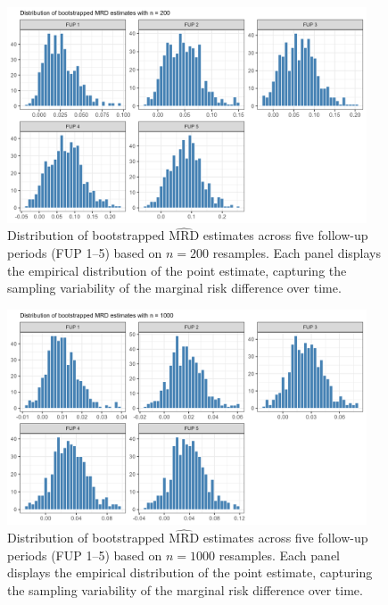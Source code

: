\documentclass[pdflatex,sn-vancouver-ay]{sn-jnl}%
\theoremstyle{thmstyleone}%
\theoremstyle{thmstyletwo}%
\theoremstyle{thmstylethree}%
\begin{document}
\begin{appendices}
\begin{figure}[h]
\centering
\includegraphics[width=0.95\textwidth]{plots_dist/plot_BSdist_200.png}
\caption{Distribution of bootstrapped $\widehat{\text{MRD}}$ estimates across five follow-up periods (FUP 1–5) based on $n = 200$ resamples. Each panel displays the empirical distribution of the point estimate, capturing the sampling variability of the marginal risk difference over time.}\label{plt:bsdist200}
\end{figure}

\begin{figure}[h]
\centering
\includegraphics[width=0.95\textwidth]{plots_dist/plot_BSdist_1000.png}
\caption{Distribution of bootstrapped $\widehat{\text{MRD}}$ estimates across five follow-up periods (FUP 1–5) based on $n = 1000$ resamples. Each panel displays the empirical distribution of the point estimate, capturing the sampling variability of the marginal risk difference over time.}\label{plt:bsdist1000}
\end{figure}


\end{appendices}
\end{document}
